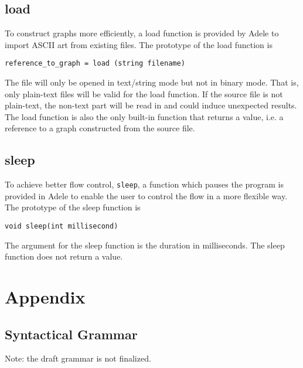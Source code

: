 \documentclass[11pt,letterpaper]{article}
\begin{document}
\subsection {load}
To construct graphs more efficiently, a load function is provided by Adele to import ASCII art from existing files. The prototype of the load function is
\begin{lstlisting}[tabsize=4]
	reference_to_graph = load (string filename)
\end{lstlisting}	
The file will only be opened in text/string mode but not in binary mode. That is, only plain-text files will be valid for the load function. If the source file is not plain-text, the non-text part will be read in and could induce unexpected results. The load function is also the only built-in function that returns a value, i.e. a reference to a graph constructed from the source file.

\subsection {sleep}
To achieve better flow control, \texttt{sleep}, a function which pauses the program is provided in Adele to enable the user to control the flow in a more flexible way. The prototype of the sleep function is
\begin{lstlisting}[tabsize=4]
	void sleep(int millisecond)
\end{lstlisting}	
The argument for the sleep function is the duration in milliseconds. The sleep function does not return a value.

\pagebreak
\section {Appendix}
\subsection {Syntactical Grammar}
Note: the draft grammar is not finalized.
\end{document}
